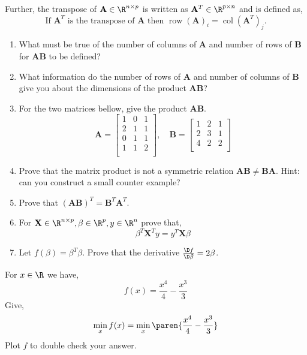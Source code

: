 \documentclass{homework}
\DeclareMathOperator{\row}{row}
\DeclareMathOperator{\col}{col}
\begin{document}
Further, the transpose of $\mathbf{A} \in \R^{n\times p}$ is
written as $\mathbf{A}^T \in \R^{p\times n}$ and is defined as,
\[
  \text{If } \mathbf{A}^T \text{ is the transpose of } \mathbf{A} \text{ then } \row(\mathbf{A})_i = \col(\mathbf{A}^T)_j.
\]
\begin{enumerate}[label=(\alph*)]
  \item What must be true of the number of columns of $\mathbf{A}$ and
        number of rows of $\mathbf{B}$ for $\mathbf{AB}$ to be defined?


  \item What information do the number of rows of $\mathbf{A}$ and number
        of columns of $\mathbf{B}$ give you about the dimensions of the
        product $\mathbf{AB}$?


  \item For the two matrices bellow, give the product $\mathbf{AB}$.
        \[
          \mathbf{A} = \begin{bmatrix} 1 & 0 & 1 \\   2 & 1 & 1 \\   0 & 1 & 1 \\   1 & 1 & 2 \\   \end{bmatrix}, \quad
          \mathbf{B} = \begin{bmatrix} 1 & 2 & 1 \\   2 & 3 & 1 \\   4 & 2 & 2 \\   \end{bmatrix}
        \]
  \item Prove that the matrix product is not a symmetric relation \ie
        $\mathbf{AB} \neq \mathbf{BA}$. Hint: can you construct a small
        counter example?
  \item Prove that $\mathbf{(AB)}^T = \mathbf{B}^T\mathbf{A}^T$.

  \item For $\mathbf{X} \in \R^{n\times p}, \beta \in \R^p, y \in \R^n$
        prove that,
        \[
          \beta^T\mathbf{X}^Ty = y^T\mathbf{X}\beta
        \]
  \item Let $f(\beta) = \beta^T\beta$. Prove that the derivative $\frac{\D
            f}{\D \beta} = 2\beta$.
\end{enumerate}
\question For $x \in \R$ we have,
\[
  f(x) = \frac{x^4}{4} - \frac{x^3}{3}
\]
Give,
\[
  \min_xf(x) = \min_x\paren{\frac{x^4}{4} - \frac{x^3}{3}}
\]
Plot $f$ to double check your answer.
\end{document}
